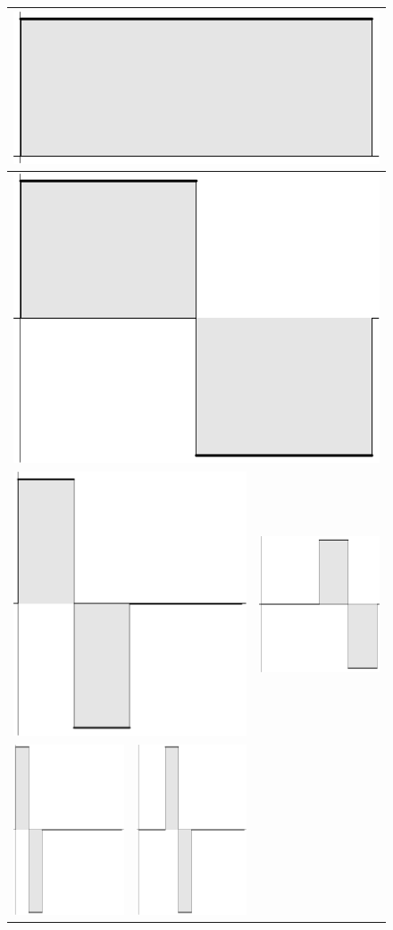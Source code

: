 \begin{figure}
\begin{tabular}{|c|c|c|c|}
\hline
\multicolumn{4}{|c|}{\includegraphics[width=0.22\hsize]{images/w-1}}\\
\hline
\multicolumn{4}{|c|}{\includegraphics[width=0.22\hsize]{images/w-8}}\\
\hline
\multicolumn{2}{|c|}{\includegraphics[width=0.22\hsize]{images/w-9}}&%
\multicolumn{2}{|c|}{\includegraphics[width=0.22\hsize]{images/w-10}}\\
\hline
\includegraphics[width=0.22\hsize]{images/w-11}&%
\includegraphics[width=0.22\hsize]{images/w-12}&%

\end{tabular}
\end{figure}
